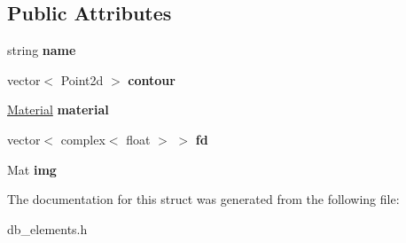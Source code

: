 \subsection*{Public Attributes}
\begin{DoxyCompactItemize}
\item 
string {\bfseries name}\hypertarget{struct_element_a63e156c168905a24437098bfff0e5366}{}\label{struct_element_a63e156c168905a24437098bfff0e5366}

\item 
vector$<$ Point2d $>$ {\bfseries contour}\hypertarget{struct_element_a891d67998b628871128c79048edbdca6}{}\label{struct_element_a891d67998b628871128c79048edbdca6}

\item 
\hyperlink{struct_material}{Material} {\bfseries material}\hypertarget{struct_element_ab4734353ea9dba55cd3cadbff0053bfb}{}\label{struct_element_ab4734353ea9dba55cd3cadbff0053bfb}

\item 
vector$<$ complex$<$ float $>$ $>$ {\bfseries fd}\hypertarget{struct_element_a0ed928b41b1f11516f3130d271d6b7e4}{}\label{struct_element_a0ed928b41b1f11516f3130d271d6b7e4}

\item 
Mat {\bfseries img}\hypertarget{struct_element_adbe2265fc367b0e01241b9d779b04f47}{}\label{struct_element_adbe2265fc367b0e01241b9d779b04f47}

\end{DoxyCompactItemize}


The documentation for this struct was generated from the following file\+:\begin{DoxyCompactItemize}
\item 
db\+\_\+elements.\+h\end{DoxyCompactItemize}
